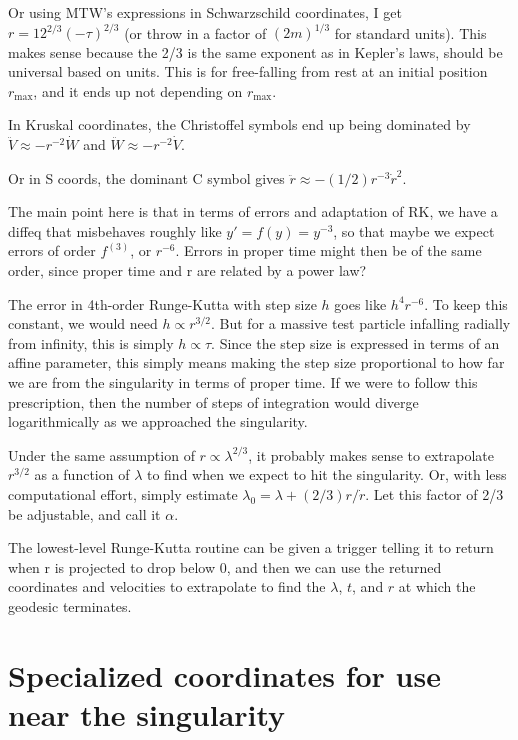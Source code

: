 \documentclass{article}
\begin{document}
Or using MTW's expressions in Schwarzschild coordinates, I get
$r=12^{2/3}(-\tau)^{2/3}$ (or throw in a factor of $(2m)^{1/3}$ for
standard units). This makes sense because the 2/3 is the same exponent
as in Kepler's laws, should be universal based on units. This is for free-falling
from rest at an initial position $r_\text{max}$, and it ends up not depending
on $r_\text{max}$.

In Kruskal coordinates, the Christoffel symbols end up being dominated by
$\ddot{V}\approx -r^{-2}\dot{W}$ and $\ddot{W}\approx -r^{-2}\dot{V}$.

Or in S coords, the dominant C symbol gives $\ddot{r}\approx -(1/2)r^{-3}\dot{r}^2$.

The main point here is that in terms of errors and adaptation of RK,
we have a diffeq that misbehaves roughly like $y'=f(y)=y^{-3}$, so that
maybe we expect errors of order $f^{(3)}$, or $r^{-6}$. Errors in proper
time might then be of the same order, since proper time and r are related
by a power law?

The error in 4th-order Runge-Kutta with step size $h$ goes like $h^4r^{-6}$.
To keep this constant, we would need $h\propto r^{3/2}$. But for a massive
test particle infalling radially from infinity, this is simply $h\propto \tau$. Since the
step size is expressed in terms of an affine parameter, this simply means
making the step size proportional to how far we are from the singularity in terms of proper time.
If we were to follow this prescription, then the number of steps of integration would diverge
logarithmically as we approached the singularity.

Under the same assumption of $r\propto\lambda^{2/3}$, it probably makes sense
to extrapolate $r^{3/2}$ as a function of $\lambda$ to find when we expect
to hit the singularity. Or, with less computational effort, simply estimate
$\lambda_0=\lambda+(2/3)r/\dot{r}$. Let this factor of 2/3 be adjustable, and
call it $\alpha$.

The lowest-level Runge-Kutta routine can be given a trigger telling it to
return when r is projected to drop below 0, and then we can use the returned
coordinates and velocities to extrapolate to find the $\lambda$, $t$, and $r$
at which the geodesic terminates.

\section{Specialized coordinates for use near the singularity}
\end{document}
